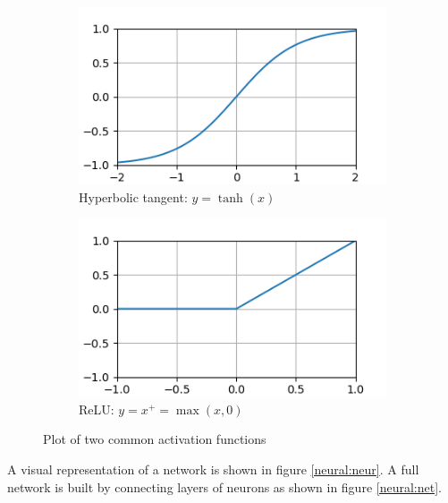 \begin{figure}
	\centering
	\begin{subfigure}[b]{.49\textwidth}
		\includegraphics[width=\textwidth]{tanh}
		\caption{Hyperbolic tangent: $y = \tanh(x)$}
		\label{figtanh}
	\end{subfigure}
	\begin{subfigure}[b]{.49\textwidth}
		\includegraphics[width=\textwidth]{relu}
		\caption{ReLU: $y = x^+ = \max(x,0)$}
		\label{figrelu}
	\end{subfigure}
	\caption{Plot of two common activation functions}
	\label{sigmafig}
\end{figure}


A visual representation of a network is shown in figure \ref{neural:neur}. A full network is built by connecting layers of neurons as shown in figure \ref{neural:net}.

